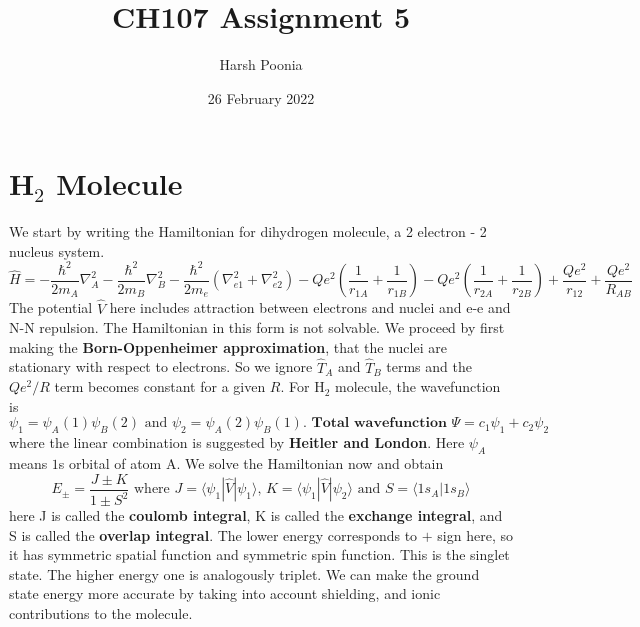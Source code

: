 \documentclass[11pt]{article}
\title{CH107 Assignment 5}
\author{Harsh Poonia}
\date{26 February 2022}
\begin{document}
\maketitle

\section*{H$_2$ Molecule}
We start by writing the Hamiltonian for dihydrogen molecule, a 2 electron - 2 nucleus system.
\[\hat{H} = -\frac{\hbar^2}{2m_A}\nabla_A^2 - \frac{\hbar^2}{2m_B}\nabla_B^2 - \frac{\hbar^2}{2m_e} \left( \nabla_{e1}^2 + \nabla_{e2}^2 \right) -Qe^2\left( \frac{1}{r_{1A}} + \frac{1}{r_{1B}} \right) -Qe^2\left( \frac{1}{r_{2A}} + \frac{1}{r_{2B}} \right) + \frac{Qe^2}{r_{12}} + \frac{Qe^2}{R_{AB}} \]
The potential $\hat{V}$ here includes attraction between electrons and nuclei and e-e and N-N repulsion. The Hamiltonian in this form is not solvable. We proceed by first making the \textbf{Born-Oppenheimer approximation}, that the nuclei are stationary with respect to electrons. So we ignore $\hat{T}_A$ and $\hat{T}_B$ terms and the $Qe^2/R$ term becomes constant for a given $R$.
For H$_2$ molecule, the wavefunction is  
\[\psi_1 = \psi_A(1) \psi_B(2) \textrm{ and } \psi_2 = \psi_A(2) \psi_B(1). \textbf{ Total wavefunction } \Psi = c_1\psi_1 + c_2 \psi_2 \]
where the linear combination is suggested by \textbf{Heitler and London}. Here $\psi_A$ means $1$s orbital of atom A. We solve the Hamiltonian now and obtain 
\[\boxed{E_{\pm} = \frac{J\pm K}{1\pm S^2}} \textrm{ where } J=\langle \psi_1 |\hat{V}|\psi_1 \rangle \textrm{, } K = \langle \psi_1 |\hat{V}|\psi_2 \rangle \textrm{ and } S=\langle 1s_A |1s_B \rangle \]
here J is called the \textbf{coulomb integral}, K is called the \textbf{exchange integral}, and S is called the \textbf{overlap integral}.
The lower energy corresponds to $+$ sign here, so it has symmetric spatial function and symmetric spin function. This is the singlet state. The higher energy one is analogously triplet. We can make the ground state energy more accurate by taking into account shielding, and ionic contributions to the molecule.
\end{document}
